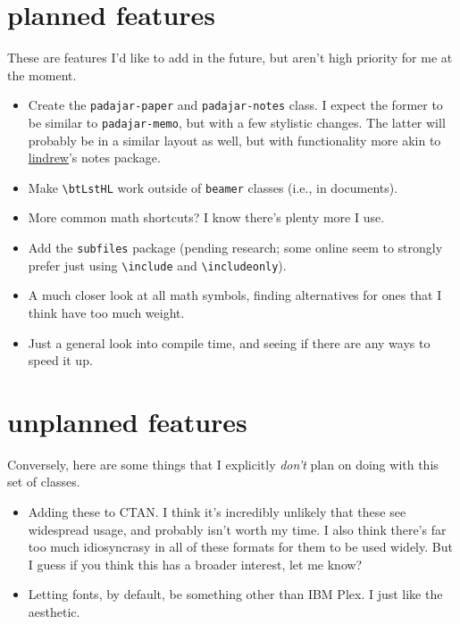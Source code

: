 \documentclass[11pt]{padajar-memo}
\newcommand{\ttslash}[1]{\texttt{\textbackslash #1}}
\begin{document}
\section{planned features}
These are features I'd like to add in the future, but aren't high priority for me at the moment.

\begin{itemize}
	\item Create the \texttt{padajar-paper} and \texttt{padajar-notes} class. I expect the former to be similar to \texttt{padajar-memo}, but with a few stylistic changes. The latter will probably be in a similar layout as well, but with functionality more akin to \href{https://web.stanford.edu/~lindrew/index.html}{lindrew}'s notes package.
	\item Make \ttslash{btLstHL} work outside of \texttt{beamer} classes (i.e., in documents).
	\item More common math shortcuts? I know there's plenty more I use.
	\item Add the \texttt{subfiles} package (pending research; some online seem to strongly prefer just using \ttslash{include} and \ttslash{includeonly}).
	\item A much closer look at all math symbols, finding alternatives for ones that I think have too much weight.
	\item Just a general look into compile time, and seeing if there are any ways to speed it up.
\end{itemize}

\section{unplanned features}

Conversely, here are some things that I explicitly \textit{don't} plan on doing with this set of classes.

\begin{itemize}
	\item Adding these to CTAN. I think it's incredibly unlikely that these see widespread usage, and probably isn't worth my time. I also think there's far too much idiosyncrasy in all of these formats for them to be used widely. But I guess if you think this has a broader interest, let me know?
	\item Letting fonts, by default, be something other than IBM Plex. I just like the aesthetic.
\end{itemize}

\appendix
\end{document}
